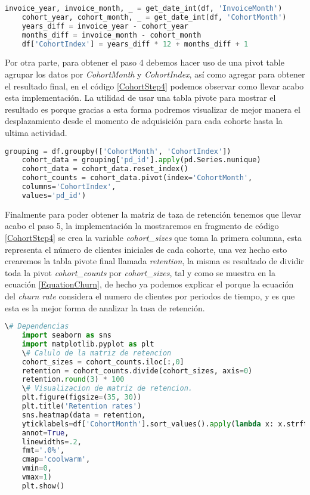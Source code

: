 \begin{lstlisting}[language=Python, caption=código para la obtención de la columna \textit{CohortIndex}, label=CohortStep3.1]
	invoice_year, invoice_month, _ = get_date_int(df, 'InvoiceMonth')
	cohort_year, cohort_month, _ = get_date_int(df, 'CohortMonth')
	years_diff = invoice_year - cohort_year
	months_diff = invoice_month - cohort_month
	df['CohortIndex'] = years_diff * 12 + months_diff + 1
\end{lstlisting}

Por otra parte, para obtener el paso 4 debemos hacer uso de una pivot table  agrupar los datos por \textit{CohortMonth} y \textit{CohortIndex}, así como agregar para obtener el resultado final, en el código \ref{CohortStep4} podemos observar como llevar acabo esta implementación. La utilidad de usar una tabla pivote para mostrar el resultado es porque gracias a esta forma podremos visualizar de mejor manera el desplazamiento desde el momento de adquisición para cada cohorte hasta la ultima actividad.

\begin{lstlisting}[language=Python, caption=código para la obtención de la columna \textit{CohortIndex}, label=CohortStep4]
	grouping = df.groupby(['CohortMonth', 'CohortIndex'])
	cohort_data = grouping['pd_id'].apply(pd.Series.nunique)
	cohort_data = cohort_data.reset_index()
	cohort_counts = cohort_data.pivot(index='CohortMonth',
	columns='CohortIndex',
	values='pd_id')
\end{lstlisting}

Finalmente para poder obtener la matriz de taza de retención tenemos que llevar acabo el paso 5, la implementación la mostraremos en fragmento de código \ref{CohortStep4} se crea la variable \textit{cohort\_sizes} que toma la primera columna, esta representa el número de clientes iniciales de cada cohorte, una vez hecho esto crearemos la tabla pivote final llamada \textit{retention}, la misma es resultado de dividir toda la pivot \textit{cohort\_counts} por \textit{cohort\_sizes}, tal y como se muestra en la ecuación \ref{EquationChurn}, de hecho ya podemos explicar el porque la ecuación del \textit{churn rate} considera el numero de clientes por periodos de tiempo, y es que esta es la mejor forma de analizar la tasa de retención.


\begin{lstlisting}[language=Python, caption=código para la obtención de la columna \textit{CohortIndex}, label=CohortStep5]
	\# Dependencias
	import seaborn as sns
	import matplotlib.pyplot as plt
	\# Calulo de la matriz de retencion
	cohort_sizes = cohort_counts.iloc[:,0]
	retention = cohort_counts.divide(cohort_sizes, axis=0)
	retention.round(3) * 100
	\# Visualizacion de matriz de retencion.
	plt.figure(figsize=(35, 30))
	plt.title('Retention rates')
	sns.heatmap(data = retention,
	yticklabels=df['CohortMonth'].sort_values().apply(lambda x: x.strftime("%Y %b, %d")).unique(),
	annot=True,
	linewidths=.2,
	fmt='.0%',
	cmap='coolwarm',
	vmin=0,
	vmax=1)
	plt.show()
\end{lstlisting}

